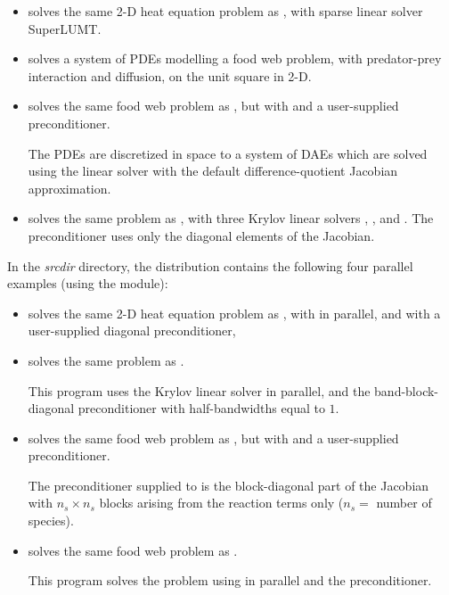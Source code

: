 \begin{itemize}
\item {}
  solves the same 2-D heat equation problem as , with
  sparse linear solver SuperLUMT.

\item {}
  solves a system of PDEs modelling a food web problem, with predator-prey
  interaction and diffusion, on the unit square in 2-D.

\item {}
  solves the same food web problem as , but with {\idaspgmr}
  and a user-supplied preconditioner.

  The PDEs are discretized in space to a system of DAEs which are solved
  using the {\idaband} linear solver with the default difference-quotient 
  Jacobian approximation.

\item {}
  solves the same problem as , with three Krylov linear solvers
  {\idaspgmr}, {\idaspbcg}, and {\idasptfqmr}.  The preconditioner uses only
  the diagonal elements of the Jacobian.

\end{itemize}

\vspace{0.2in}\noindent
In the {\em srcdir} directory, the {\ida} 
distribution contains the following four parallel examples 
(using the {\nvecp} module):
\begin{itemize}

\item {}
  solves the same 2-D heat equation problem as , with {\idaspgmr}
  in parallel, and with a user-supplied diagonal preconditioner,
  
\item {}
  solves the same problem as .

  This program  uses the Krylov linear solver {\idaspgmr} in parallel, and the
  band-block-diagonal preconditioner {\idabbdpre} with half-bandwidths equal to $1$.

\item {}
  solves the same food web problem as , but with {\idaspgmr}
  and a user-supplied preconditioner.
  
  The preconditioner supplied to {\idaspgmr} is the block-diagonal part of 
  the Jacobian with $n_s \times n_s$ blocks arising from the reaction terms only
  ($n_s =$ number of species).

\item {}
  solves the same food web problem as .

  This program solves the problem using {\idaspgmr} in parallel and the
  {\idabbdpre} preconditioner.

\end{itemize}

